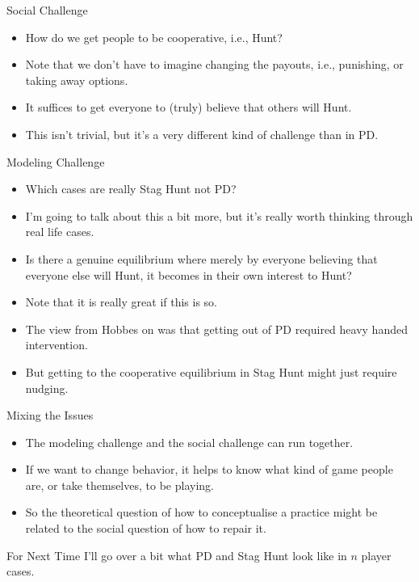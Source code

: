 \documentclass[
  ignorenonframetext,
]{beamer}
\providecommand{\tightlist}{%
  \setlength{\itemsep}{0pt}\setlength{\parskip}{0pt}}
\begin{document}
\begin{frame}{Social Challenge}
\protect\hypertarget{social-challenge}{}
\begin{itemize}
\tightlist
\item
  How do we get people to be cooperative, i.e., Hunt?
\item
  Note that we don't have to imagine changing the payouts, i.e.,
  punishing, or taking away options.
\item
  It suffices to get everyone to (truly) believe that others will Hunt.
\item
  This isn't trivial, but it's a very different kind of challenge than
  in PD.
\end{itemize}
\end{frame}

\begin{frame}{Modeling Challenge}
\protect\hypertarget{modeling-challenge}{}
\begin{itemize}
\tightlist
\item
  Which cases are really Stag Hunt not PD?
\item
  I'm going to talk about this a bit more, but it's really worth
  thinking through real life cases.
\item
  Is there a genuine equilibrium where merely by everyone believing that
  everyone else will Hunt, it becomes in their own interest to Hunt?
  \pause
\item
  Note that it is really great if this is so.
\item
  The view from Hobbes on was that getting out of PD required heavy
  handed intervention.
\item
  But getting to the cooperative equilibrium in Stag Hunt might just
  require nudging.
\end{itemize}
\end{frame}

\begin{frame}{Mixing the Issues}
\protect\hypertarget{mixing-the-issues}{}
\begin{itemize}
\tightlist
\item
  The modeling challenge and the social challenge can run together.
\item
  If we want to change behavior, it helps to know what kind of game
  people are, or take themselves, to be playing.
\item
  So the theoretical question of how to conceptualise a practice might
  be related to the social question of how to repair it.
\end{itemize}
\end{frame}

\begin{frame}{For Next Time}
\protect\hypertarget{for-next-time}{}
I'll go over a bit what PD and Stag Hunt look like in \(n\) player
cases.
\end{frame}
\end{document}
